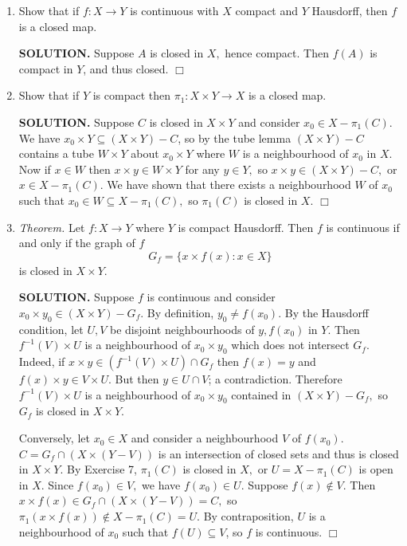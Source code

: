 \documentclass{article}
\begin{document}
\begin{enumerate}
    \item Show that if $f: X \rightarrow Y$ is continuous with $X$ compact and $Y$ Hausdorff, then $f$ is a closed map.

    {\bf SOLUTION.} Suppose $A$ is closed in $X,$ hence compact. Then $f(A)$ is compact in $Y$, and thus closed. $\Box$

    \item Show that if $Y$ is compact then $\pi_1: X \times Y \rightarrow X$ is a closed map.

    {\bf SOLUTION.} Suppose $C$ is closed in $X \times Y$ and consider $x_0 \in X - \pi_1(C).$ We have $x_0 \times Y \subseteq (X \times Y) - C$, so by the tube lemma $(X \times Y) - C$ contains a tube $W \times Y$ about $x_0 \times Y$ where $W$ is a neighbourhood of $x_0$ in $X.$ Now if $x \in W$ then $x \times y \in W \times Y$ for any $y \in Y,$ so $x \times y \in (X \times Y) - C,$ or $x \in X - \pi_1(C).$ We have shown that there exists a neighbourhood $W$ of $x_0$ such that $x_0 \in W \subseteq X-\pi_1(C),$ so $\pi_1(C)$ is closed in $X.$ $\Box$

    \item {\it Theorem.} Let $f: X \rightarrow Y$ where $Y$ is compact Hausdorff. Then $f$ is continuous if and only if the graph of $f$
    $$G_f = \{x \times f(x): x \in X\}$$
    is closed in $X \times Y.$

    {\bf SOLUTION.} Suppose $f$ is continuous and consider $x_0 \times y_0 \in (X \times Y) - G_f.$ By definition, $y_0 \neq f(x_0).$ By the Hausdorff condition, let $U, V$ be disjoint neighbourhoods of $y, f(x_0)$ in $Y.$ Then $f^{-1}(V) \times U$ is a neighbourhood of $x_0 \times y_0$ which does not intersect $G_f.$ Indeed, if $x \times y \in (f^{-1}(V) \times U) \cap G_f$ then $f(x) = y$ and $f(x) \times y \in V \times U$. But then $y \in U \cap V$; a contradiction. Therefore $f^{-1}(V) \times U$ is a neighbourhood of $x_0 \times y_0$ contained in $(X \times Y) - G_f,$ so $G_f$ is closed in $X \times Y.$

    Conversely, let $x_0 \in X$ and consider a neighbourhood $V$ of $f(x_0).$ $C = G_f \cap (X \times (Y-V))$ is an intersection of closed sets and thus is closed in $X \times Y$. By Exercise 7, $\pi_1(C)$ is closed in $X,$ or $U = X - \pi_1(C)$ is open in $X.$ Since $f(x_0) \in V,$ we have $f(x_0) \in U.$ Suppose $f(x) \notin V.$ Then $x \times f(x) \in G_f \cap (X \times (Y - V)) = C,$ so $\pi_1(x \times f(x)) \notin X - \pi_1(C) = U.$ By contraposition, $U$ is a neighbourhood of $x_0$ such that $f(U) \subseteq V$, so $f$ is continuous. $\Box$


\end{enumerate}
\end{document}
